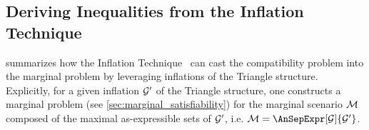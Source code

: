 \documentclass[aps, 10pt, english, twoside, pra, nofootinbib, tightenlines, longbibliography, superscriptaddress]{revtex4-1}
\begin{document}



    \subsection{Deriving Inequalities from the Inflation Technique}
    \label{sec:deriving_inequalities_from_the_inflation_technique}

     summarizes how the Inflation Technique~\cite{Inflation} can cast the compatibility problem into the marginal problem by leveraging inflations of the Triangle structure. Explicitly, for a given inflation $\mathcal{G}'$ of the Triangle structure, one constructs a marginal problem (see \cref{sec:marginal_satisfiability}) for the marginal scenario $\mathcal{M}$ composed of the maximal as-expressible sets of $\mathcal{G}'$, i.e. $\mscenario = \AnSepExpr[\graph]{\graph'}$.
\end{document}
